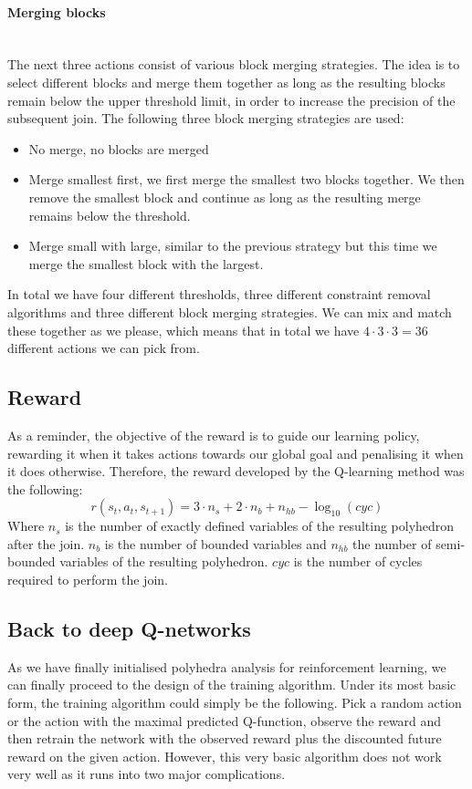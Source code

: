 \paragraph{Merging blocks}\mbox{}\\
The next three actions consist of various block merging strategies. The idea is to select different blocks and merge them together as long as the resulting blocks remain below the upper threshold limit, in order to increase the precision of the subsequent join. The following three block merging strategies are used:
\begin{itemize}
	\item No merge, no blocks are merged
	\item Merge smallest first, we first merge the smallest two blocks together. We then remove the smallest block and continue as long as the resulting merge remains below the threshold.
	\item Merge small with large, similar to the previous strategy but this time we merge the smallest block with the largest.
\end{itemize}

In total we have four different thresholds, three different constraint removal algorithms and three different block merging strategies. We can mix and match these together as we please, which means that in total we have $4\cdot 3\cdot 3 =36$ different actions we can pick from.

\subsection{Reward}
As a reminder, the objective of the reward is to guide our learning policy, rewarding it when it takes actions towards our global goal and penalising it when it does otherwise. Therefore, the reward developed by the Q-learning method was the following:
\begin{equation}
	r(s_t,a_t,s_{t+1}) = 3  \cdot n_s + 2 \cdot n_b + n_{hb} - \log_{10}(cyc)
\end{equation}
Where $n_s$ is the number of exactly defined variables of the resulting polyhedron after the join. $n_b$ is the number of bounded variables and $n_{hb}$ the number of semi-bounded variables of the resulting polyhedron. $cyc$ is the number of cycles required to perform the join.
\subsection{Back to deep Q-networks}
As we have finally initialised polyhedra analysis for reinforcement learning, we can finally proceed to the design of the training algorithm. Under its most basic form, the training algorithm could simply be the following. Pick a random action or the action with the maximal predicted Q-function, observe the reward and then retrain the network with the observed reward plus the discounted future reward on the given action. However, this very basic algorithm does not work very well as it runs into two major complications.

